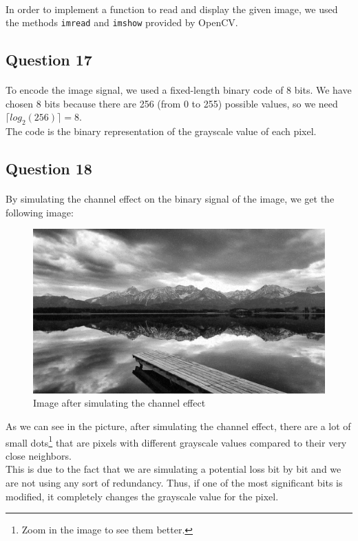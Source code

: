 \documentclass[a4paper, 11pt, oneside]{article}
\begin{document}
\paragraph{}In order to implement a function to read and display the given image, we used the methods \texttt{imread} and \texttt{imshow} provided by OpenCV.


\subsection{Question 17}
\paragraph{}To encode the image signal, we used a fixed-length binary code of 8 bits. We have chosen 8 bits because there are 256 (from 0 to 255) possible values, so we need $\lceil log_2(256) \rceil =8$.\\
The code is the binary representation of the grayscale value of each pixel.


\subsection{Question 18}
\paragraph{}By simulating the channel effect on the binary signal of the image, we get the following image:
\begin{figure}[H]
    \centering
    \includegraphics[scale=0.2]{q18.png}
    \caption{Image after simulating the channel effect}
\end{figure}
As we can see in the picture, after simulating the channel effect, there are a lot of small dots\footnote{Zoom in the image to see them better.} that are pixels with different grayscale values
compared to their very close neighbors.\\
This is due to the fact that we are simulating a potential loss bit by bit and we are not using any sort of redundancy.
Thus, if one of the most significant bits is modified, it completely changes the grayscale value for the pixel.
\end{document}
